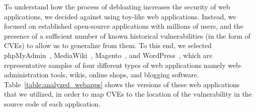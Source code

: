 To understand how the process of debloating increases the security of web
applications, we decided against using toy-like web applications. Instead,
we focused on established open-source applications with millions of users,
and the presence of a sufficient number of known historical vulnerabilities
(in the form of CVEs) to allow us to generalize from them. To this end, we
selected {phpMyAdmin}~\cite{phpmyadmin},
{MediaWiki}~\cite{mediawiki}, {Magento}~\cite{magento}, and WordPress~\cite{wordpress},
which are representative samples of four different types of
web applications namely web-administration tools, wikis, online
shops, and blogging software. Table~\ref{table:analyzed_webapps} shows the versions of these web
applications that we utilized, in order to map CVEs to the location of the
vulnerability in the source code of each application.



\begin{table}[]
\centering
\caption{Analyzed open-source web applications.}
\label{table:analyzed_webapps}
\end{table}

